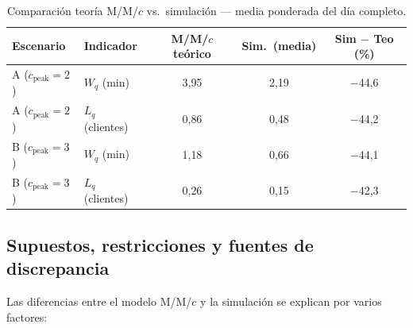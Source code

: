 \begin{table}[H]
  \centering
  \caption{Comparación teoría M/M/$c$ vs.\ simulación ---
           media ponderada del día completo.}
  \label{tab:teoria_vs_sim}
  \small
  \begin{tabular}{llccc}
    \toprule
    \textbf{Escenario} & \textbf{Indicador}
      & \textbf{M/M/$c$ teórico}
      & \textbf{Sim.\ (media)}
      & \textbf{Sim $-$ Teo (\%)} \\
    \midrule
    A ($c_{\text{peak}}=2$) & $W_q$ (min)      & 3{,}95 & 2{,}19 & $-$44{,}6 \\
    A ($c_{\text{peak}}=2$) & $L_q$ (clientes) & 0{,}86 & 0{,}48 & $-$44{,}2 \\
    B ($c_{\text{peak}}=3$) & $W_q$ (min)      & 1{,}18 & 0{,}66 & $-$44{,}1 \\
    B ($c_{\text{peak}}=3$) & $L_q$ (clientes) & 0{,}26 & 0{,}15 & $-$42{,}3 \\
    \bottomrule
  \end{tabular}
\end{table}

\subsection{Supuestos, restricciones y fuentes de discrepancia}

Las diferencias entre el modelo M/M/$c$ y la simulación se explican por
varios factores:

